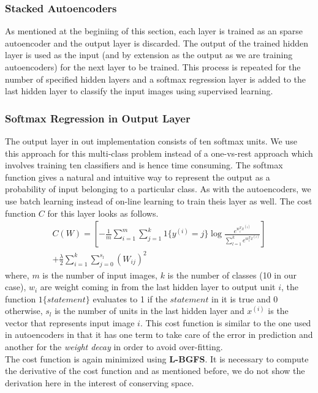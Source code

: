 \documentclass[10pt,twocolumn,letterpaper]{article}
\begin{document}
\subsubsection{Stacked Autoencoders}
As mentioned at the beginiing of this section, each layer is trained as an sparse autoencoder and the output layer is discarded. The output of the trained hidden layer is used as the input (and by extension as the output as we are training autoencoders) for the next layer to be trained. This process is repeated for the number of specified hidden layers and a softmax regression layer is added to the last hidden layer to classify the input images using supervised learning.

\subsubsection{Softmax Regression in Output Layer}
The output layer in out implementation consists of ten softmax units. We use this approach for this multi-class problem instead of a one-vs-rest approach which involves training ten classifiers and is hence time consuming. The softmax function gives a natural and intuitive way to represent the output as a probability of input belonging to a particular class. As with the autoencoders, we use batch learning instead of on-line learning to train theis layer as well. The cost function $C$ for this layer looks as follows.
\begin{multline*}
C(W) = \left[-\frac{1}{m}\sum\limits_{i=1}^m \sum\limits_{j=1}^k 1\{y^{(i)} = j\} \log \frac{e^{w_i^Tx^{(i)}}}{\sum_{l=1}^{k} e^{w_l^Tx^{(i)}}}\right]\\
+ \frac{\lambda}{2}\sum\limits_{i=1}^k \sum\limits_{j=0}^{s_l} (W_{ij})^2
\end{multline*}
where, $m$ is the number of input images, $k$ is the number of classes (10 in our case), $w_i$ are weight coming in from the last hidden layer to output unit $i$, the function $1\{statement\}$ evaluates to 1 if the $statement$ in it is true and 0 otherwise, $s_l$ is the number of units in the last hidden layer and $x^{(i)}$ is the vector that represents input image $i$. This cost function is similar to the one used in autoencoders in that it has one term to take care of the error in prediction and another for the \textit{weight decay} in order to avoid over-fitting.\\

The cost function is again minimized using \textbf{L-BGFS}. It is necessary to compute the derivative of the cost function and as mentioned before, we do not show the derivation here in the interest of conserving space.
\end{document}
